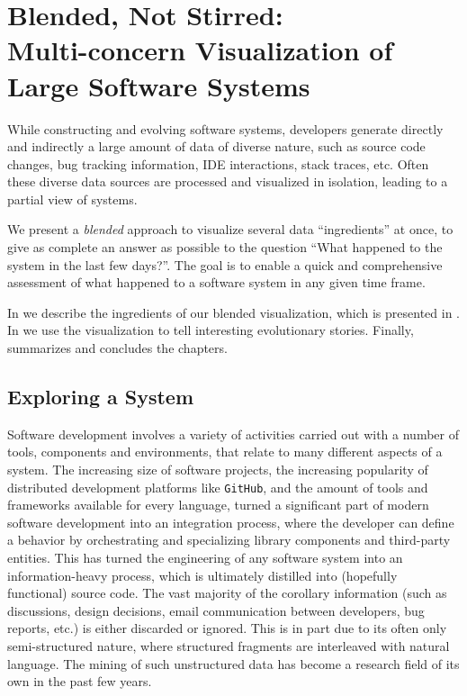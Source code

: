 

\chapter{Blended, Not Stirred: \\Multi-concern Visualization of \\Large Software Systems}\label{ch:blend}


While constructing and evolving software systems, developers generate directly and indirectly a large amount of data of diverse nature, such as source code changes, bug tracking information, IDE interactions, stack traces, etc.
Often these diverse data sources are processed and visualized in isolation, leading to a partial view of systems.

We present a \emph{blended} approach to visualize several data ``ingredients'' at once, to give as complete an answer as possible to the question {``What happened to the system in the last few days?''}.
The goal is to enable a quick and comprehensive assessment of what happened to a software system in any given time frame.

\structure

In  we describe the ingredients of our blended visualization, which is presented in .
In  we use the visualization to tell interesting evolutionary stories.
Finally,  summarizes and concludes the chapters.

\newpage


\section{Exploring a System} \label{sec:blend-intro}

Software development involves a variety of activities carried out with a number of tools, components and environments, that relate to many different aspects of a system.
The increasing size of software projects, the increasing popularity of distributed development platforms like \texttt{GitHub}, and the amount of tools and frameworks available for every language, turned a significant part of modern software development into an integration process, where the developer can define a behavior by orchestrating and specializing library components and third-party entities.
This has turned the engineering of any software system into an information-heavy process, which is ultimately distilled into (hopefully functional) source code.
The vast majority of the corollary information (such as discussions, design decisions, email communication between developers, bug reports, etc.) is either discarded or ignored.
This is in part due to its often only semi-structured nature, where structured fragments are interleaved with natural language.
The mining of such unstructured data has become a research field of its own in the past few years.

